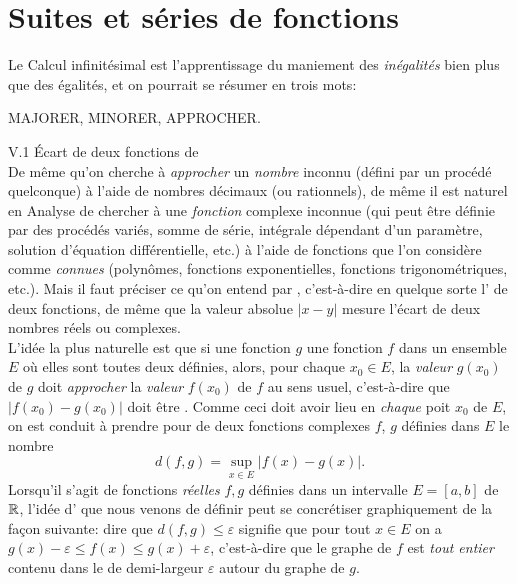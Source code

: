 \chapter{Suites et séries de fonctions}

Le Calcul infinitésimal est l'apprentissage du maniement des \emph{inégalités} bien plus que des égalités, et on pourrait se résumer en trois mots:
\begin{center}
        MAJORER, MINORER, APPROCHER.
\end{center}

V.1 Écart de deux fonctions de \cite{calcul_infinitesimal} \\
De même qu'on cherche à \emph{approcher} un \emph{nombre} inconnu (défini par un procédé quelconque) à l'aide de nombres décimaux (ou rationnels), de même il est naturel en Analyse de chercher à  une \emph{fonction} complexe inconnue (qui peut être définie par des procédés variés, somme de série, intégrale dépendant d'un paramètre, solution d'équation différentielle, etc.) à l'aide de fonctions que l'on considère comme \emph{connues} (polynômes, fonctions exponentielles, fonctions trigonométriques, etc.). Mais il faut préciser ce qu'on entend par , c'est-à-dire  en quelque sorte l' de deux fonctions, de même que la valeur absolue $|x-y|$ mesure l'écart de deux nombres réels ou complexes. \\
L'idée la plus naturelle est que si une fonction $g$  une fonction $f$ dans un ensemble $E$ où elles sont toutes deux définies, alors, pour chaque $x_0 \in E$, la \emph{valeur} $g(x_0)$ de $g$ doit \emph{approcher} la \emph{valeur} $f(x_0)$ de $f$ au sens usuel, c'est-à-dire que $|f(x_0)-g(x_0)|$ doit être . Comme ceci doit avoir lieu en \emph{chaque} poit $x_0$ de $E$, on est conduit à prendre pour  de deux fonctions complexes $f$, $g$ définies dans $E$ le nombre
$$d(f, g) = \sup_{x \in E} |f(x)-g(x)|.$$
Lorsqu'il s'agit de fonctions \emph{réelles} $f, g$ définies dans un intervalle $E = [a, b]$ de $\mathbb{R}$, l'idée d' que nous venons de définir peut se concrétiser graphiquement de la façon suivante: dire que $d(f,g) \leqslant \varepsilon$ signifie que pour tout $x \in E$ on a $g(x)-\varepsilon \leqslant f(x) \leqslant g(x) + \varepsilon$, c'est-à-dire que le graphe de $f$ est \emph{tout entier} contenu dans le  de demi-largeur $\varepsilon$ autour du graphe de $g$. \\
